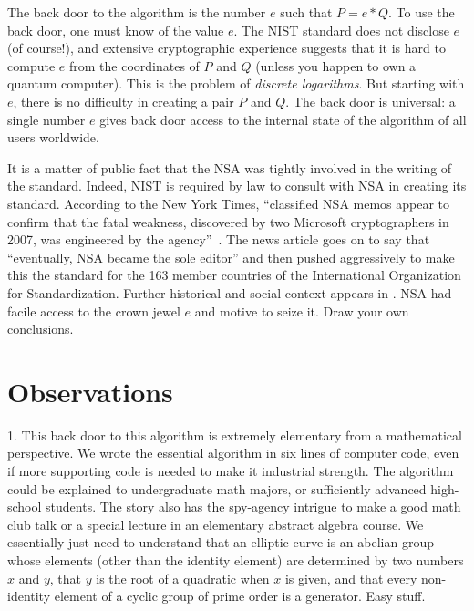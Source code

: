 \documentclass[11pt]{amsart} %
\begin{document}
The back door to the algorithm is the number $e$  such that $P = e * Q$. To use the back door,
one must  know of the value $e$.  The NIST standard
does not disclose $e$ (of course!), 
and extensive cryptographic experience suggests that it is hard to compute $e$
from the coordinates of $P$ and $Q$ (unless you happen to own a quantum computer).   
This is the problem of {\it discrete logarithms}.
But starting with $e$, there is no difficulty
in creating a pair $P$ and $Q$.  The back door is universal: a single number $e$ gives
back door access to the internal state of the algorithm of all users worldwide.

It is a matter of public fact that the NSA was tightly involved in the writing
of the standard.   Indeed, NIST is required by law to consult with NSA in creating its standard.  
According to the New York Times, 
``classified NSA memos appear to confirm that the fatal weakness, discovered by two Microsoft cryptographers in 2007, was engineered by the agency''~\cite{NYT-backdoor}.
The news article goes on to say that ``eventually, NSA became the sole editor'' and then pushed aggressively to make this the standard for
the 163 member countries of the International Organization for Standardization.
Further historical and social context appears in \cite{Wired-backdoor}.
NSA had facile access to the crown jewel $e$ and motive to seize it.  Draw your own conclusions.

% 

\section{Observations}

1.  This back door to this algorithm is extremely elementary from a mathematical perspective.  We wrote 
the essential algorithm in six lines of computer code, even if more supporting code is needed to make it industrial strength.
The algorithm could be explained to undergraduate math majors, or sufficiently advanced high-school students.
The story also has the spy-agency intrigue to make a good math club talk or a special lecture in an
elementary abstract algebra course.
We essentially just need to understand that an elliptic curve is an abelian group whose elements 
(other than the identity element) are
determined by two numbers $x$ and $y$, that $y$ is the root of a quadratic when $x$ is given,
and that every non-identity element of a cyclic group of prime order is a generator.
Easy stuff.
\end{document}
